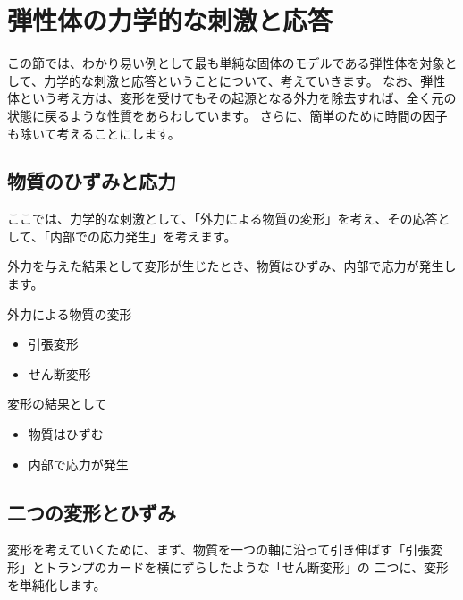 \documentclass[uplatex,dvipdfmx,a4paper,11pt]{jsreport}
\begin{document}
\section{弾性体の力学的な刺激と応答}

この節では、わかり易い例として最も単純な固体のモデルである弾性体を対象として、力学的な刺激と応答ということについて、考えていきます。
なお、弾性体という考え方は、変形を受けてもその起源となる外力を除去すれば、全く元の状態に戻るような性質をあらわしています。
さらに、簡単のために時間の因子も除いて考えることにします。

\subsection{物質のひずみと応⼒}
ここでは、力学的な刺激として、「外力による物質の変形」を考え、その応答として、「内部での応力発生」を考えます。

外力を与えた結果として変形が生じたとき、物質はひずみ、内部で応力が発生します。
\large
	\begin{center}
		\begin{minipage}{0.38\textwidth}
			\begin{itembox}[l]{外力による物質の変形}
				\begin{itemize}
					\item 引張変形
					\item せん断変形
				\end{itemize}
			\end{itembox}
		\end{minipage}
		\begin{minipage}{0.38\textwidth}
			\begin{itembox}[l]{変形の結果として}
				\begin{itemize}
					\item 物質はひずむ
					\item 内部で応力が発生
				\end{itemize}
			\end{itembox}
		\end{minipage}
	\end{center}
\normalsize

\subsection{二つの変形とひずみ}
変形を考えていくために、まず、物質を一つの軸に沿って引き伸ばす「引張変形」とトランプのカードを横にずらしたような「せん断変形」の
二つに、変形を単純化します。
\end{document}
